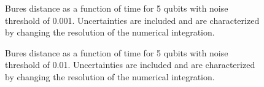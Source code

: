 \begin{figure}
\begin{center}
\end{center}
\caption{Bures distance as a function of time for 5 qubits with noise
threshold of 0.001.  Uncertainties are included and are characterized 
by changing the resolution of the numerical integration.}
\end{figure}

\begin{figure}
\begin{center}
\end{center}
\caption{Bures distance as a function of time for 5 qubits with noise
threshold of 0.01.  Uncertainties are included and are characterized 
by changing the resolution of the numerical integration.}
\end{figure}

